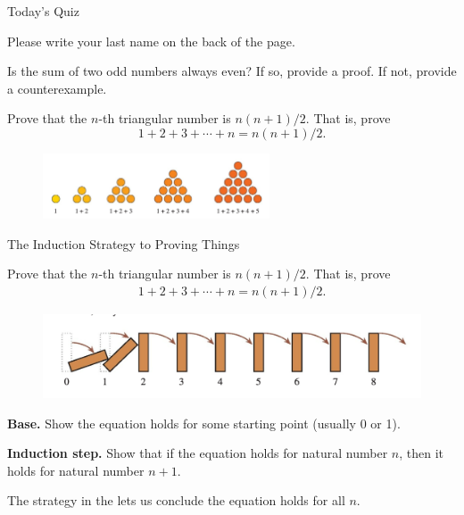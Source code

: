 \documentclass[10pt]{beamer}
\begin{document}
\begin{frame}{Today's Quiz}

\begin{myyellowbox}[title=Logistics Alert]
Please write your last name on the back of the page. 
\end{myyellowbox}
\vfill


 \begin{myredbox} [title=Problems Quiz (Secs. 5 and 6 - Proofs and Counterexamples)]
Is the sum of two odd numbers always even?  If so, provide a proof. If not, provide a counterexample.
\end{myredbox}


 \begin{mygreenbox}[title=Reading Quiz (Induction)]
Prove that the $n$-th triangular number is $n(n+1)/2$.  That is, prove 
\[1+ 2+ 3+ \cdots + n = n(n+1)/2.\]
\begin{figure}[ht]
 \centering
 \includegraphics[width=0.6\textwidth]{images/triangular_numbers}
\end{figure}
\end{mygreenbox}

\end{frame}




\begin{frame}{The Induction Strategy to Proving Things}
\small
 \begin{mygreenbox}[title=Reading Quiz (Induction)]
Prove that the $n$-th triangular number is $n(n+1)/2$.  That is, prove 
%
\begin{align*}
1+ 2+ 3+ \cdots + n = n(n+1)/2.
\end{align*}
%
\end{mygreenbox}

\vfill 

 \begin{myyellowbox}[title=Induction Strategy]
\begin{figure}
\includegraphics[width=\textwidth]{images/dominos.png}
\end{figure}

\textbf{Base.} Show the equation holds for some starting point (usually 0 or 1).

\textbf{Induction step.} Show that if the equation holds for natural number $n$, then it holds for natural number $n+1$.   
 \end{myyellowbox}

\vfill 
The strategy in the  lets us conclude the equation holds for all $n$.
\end{frame} 
\end{document}
